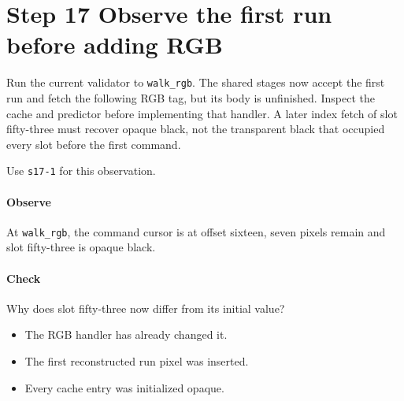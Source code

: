 \section{Step 17 Observe the first run before adding RGB}\label{qoi-s17}
Run the current validator to \texttt{walk\_rgb}. The shared stages now accept the first run and fetch the following RGB tag, but its body is unfinished. Inspect the cache and predictor before implementing that handler. A later index fetch of slot fifty-three must recover opaque black, not the transparent black that occupied every slot before the first command.

Use \texttt{s17-1} for this observation.

\paragraph{Observe} At \texttt{walk\_rgb}, the command cursor is at offset sixteen, seven pixels remain and slot fifty-three is opaque black.

\paragraph{Check} Why does slot fifty-three now differ from its initial value?
\begin{itemize}
\item[A.] The RGB handler has already changed it.
\item[B.] The first reconstructed run pixel was inserted.
\item[C.] Every cache entry was initialized opaque.
\end{itemize}
